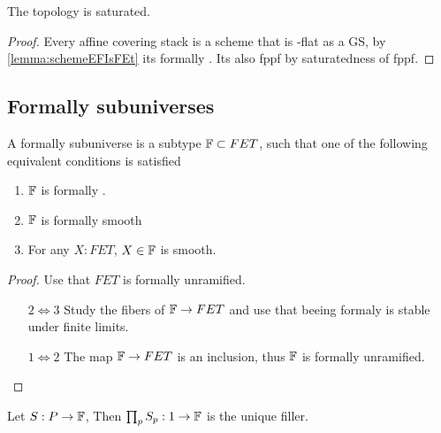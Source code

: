 \begin{corollary}{\label{cor:EtaleSat}}
	The \etale topology is saturated.
\end{corollary}
\begin{proof}
	Every affine covering stack is a scheme that is \etale-flat as a GS, by \ref{lemma:schemeEFIsFEt} its formally \etale. Its also fppf by saturatedness of fppf.
\end{proof}
\subsection{Formally \etale subuniverses}
\begin{definition}{\label{lemma:FisFet}}
	A formally \etale subuniverse is a subtype $\mathbb{F} \subset FET$, such that one of the following equivalent conditions is satisfied
	\begin{enumerate}
		\item  $\mathbb{F}$ is formally \etale.
		\item $\mathbb{F}$ is formally smooth
		\item For any $X : FET$, $X \in \mathbb{F}$ is smooth.
	\end{enumerate}
\end{definition}
\begin{proof}
	Use that 	$FET$ is formally unramified.
	\begin{enumerate}
		\item [$2 \Leftrightarrow 3$] Study the fibers of $\mathbb{F} \to FET$ and use that beeing formaly \etale is stable under finite limits.
		\item [$1 \Leftrightarrow 2$]  The map $\mathbb{F} \to FET$ is an inclusion, thus $\mathbb{F}$ is formally unramified.
	\end{enumerate}
	
\end{proof}


\begin{lemma}{\label{cor:SubUnivDepProdStable}}
	Let $S : P \to \mathbb{F}$, Then $\prod_p S_p : 1 \to \mathsf{\mathbb{F}}$ is the unique filler.
\end{lemma}

